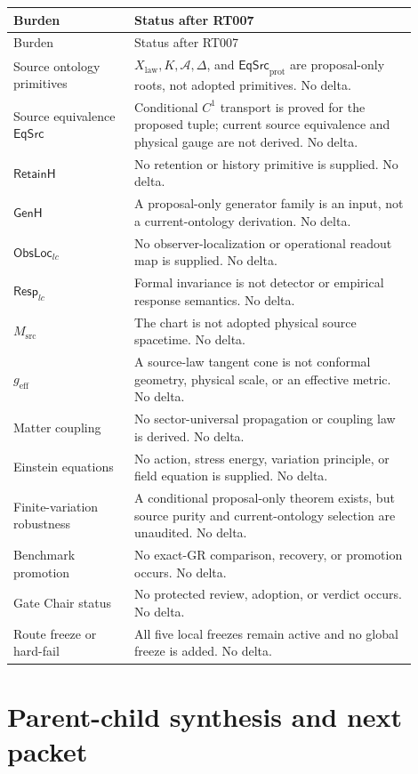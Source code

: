 \documentclass[11pt]{article}
\newcommand{\EqSrc}{\mathsf{EqSrc}_{\mathrm{prot}}}
\begin{document}
\begin{longtable}{P{0.27\linewidth}P{0.63\linewidth}}
\toprule
Burden & Status after RT007 \\
\midrule
\endfirsthead
\toprule
Burden & Status after RT007 \\
\midrule
\endhead
Source ontology primitives & \(X_{\mathrm{law}},K,\mathcal A,\Delta\), and
\(\EqSrc\) are proposal-only roots, not adopted primitives.  No delta.\\
Source equivalence \(\mathsf{EqSrc}\) & Conditional \(C^1\) transport is
proved for the proposed tuple; current source equivalence and physical gauge
are not derived.  No delta.\\
\(\mathsf{RetainH}\) & No retention or history primitive is supplied.  No
delta.\\
\(\mathsf{GenH}\) & A proposal-only generator family is an input, not a
current-ontology derivation.  No delta.\\
\(\mathsf{ObsLoc}_{lc}\) & No observer-localization or operational readout
map is supplied.  No delta.\\
\(\mathsf{Resp}_{lc}\) & Formal invariance is not detector or empirical
response semantics.  No delta.\\
\(M_{\mathrm{src}}\) & The chart is not adopted physical source spacetime.
No delta.\\
\(g_{\mathrm{eff}}\) & A source-law tangent cone is not conformal geometry,
physical scale, or an effective metric.  No delta.\\
Matter coupling & No sector-universal propagation or coupling law is derived.
No delta.\\
Einstein equations & No action, stress energy, variation principle, or field
equation is supplied.  No delta.\\
Finite-variation robustness & A conditional proposal-only theorem exists,
but source purity and current-ontology selection are unaudited.  No delta.\\
Benchmark promotion & No exact-GR comparison, recovery, or promotion occurs.
No delta.\\
Gate Chair status & No protected review, adoption, or verdict occurs.  No
delta.\\
Route freeze or hard-fail & All five local freezes remain active and no global
freeze is added.  No delta.\\
\bottomrule
\end{longtable}

\section{Parent-child synthesis and next packet}
\end{document}
